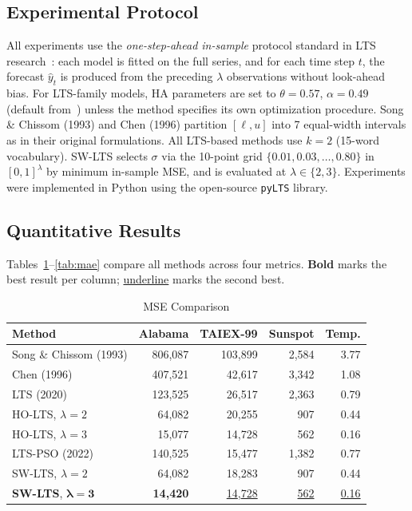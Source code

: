 \documentclass[conference]{IEEEtran}
\begin{document}
\subsection{Experimental Protocol}

All experiments use the \emph{one-step-ahead in-sample} protocol
standard in LTS research~\cite{hieu2020lts,hieu2021holts}: each model
is fitted on the full series, and for each time step $t$, the forecast
$\hat{y}_t$ is produced from the preceding $\lambda$ observations
without look-ahead bias. For LTS-family models, HA parameters are set
to $\theta=0.57$, $\alpha=0.49$ (default from~\cite{hieu2020lts})
unless the method specifies its own optimization procedure. Song \&
Chissom (1993) and Chen (1996) partition $[\ell, u]$ into 7 equal-width
intervals as in their original formulations. All LTS-based methods
use $k=2$ (15-word vocabulary). SW-LTS selects $\sigma$ via the
10-point grid $\{0.01, 0.03, \ldots, 0.80\}$ in $[0,1]^\lambda$ by
minimum in-sample MSE, and is evaluated at $\lambda \in \{2,3\}$.
Experiments were implemented in Python using the open-source
\texttt{pyLTS} library.

\subsection{Quantitative Results}

Tables~\ref{tab:mse}--\ref{tab:mae} compare all methods across four
metrics. \textbf{Bold} marks the best result per column;
\underline{underline} marks the second best.

\begin{table}[htbp]
\centering
\caption{MSE Comparison}
\label{tab:mse}
\begin{tabular}{@{}lrrrr@{}}
\toprule
Method & Alabama & TAIEX-99 & Sunspot & Temp. \\
\midrule
Song \& Chissom (1993) & 806{,}087 & 103{,}899 & 2{,}584 & 3.77 \\
Chen (1996)            & 407{,}521 &  42{,}617 & 3{,}342 & 1.08 \\
LTS (2020)             & 123{,}525 &  26{,}517 & 2{,}363 & 0.79 \\
HO-LTS, $\lambda=2$   &  64{,}082 &  20{,}255 &    907  & 0.44 \\
HO-LTS, $\lambda=3$   &  15{,}077 &  14{,}728 &    562  & 0.16 \\
LTS-PSO (2022)         & 140{,}525 &  15{,}477 & 1{,}382 & 0.77 \\
\midrule
SW-LTS, $\lambda=2$   &  64{,}082 &  18{,}283 &    907  & 0.44 \\
\textbf{SW-LTS}, $\bm{\lambda=3}$ & \textbf{14{,}420} & \underline{14{,}728} & \underline{562} & \underline{0.16} \\
\bottomrule
\end{tabular}
\end{table}
\end{document}

